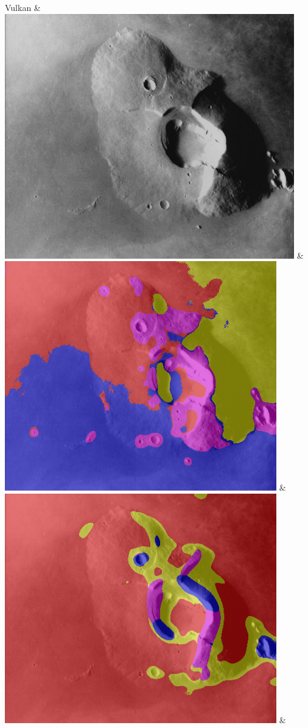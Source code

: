 \begin{table}[h!]
\begin{tabularx}{\textwidth}
		Vulkan &
		\includegraphics[width=.9\linewidth]{images/Gre13/Gre13_02.jpg} &
		\includegraphics[width=.9\linewidth]{images/gen/filterbanks/Gre13_02.jpg_TSUGF.png} &
		\includegraphics[width=.9\linewidth]{images/gen/filterbanks/Gre13_02.jpg_LM.png} &

\end{tabularx}
\end{table}
